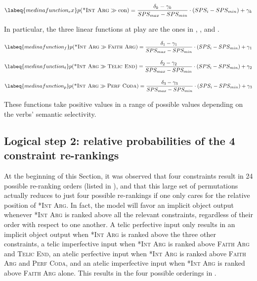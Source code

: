 \begin{equation} \labeq{medinafunction_ex}
p(\textsc{*Int Arg} \gg \textrm{con}) = \frac{\delta_k - \gamma_k}{SPS_{max} - SPS_{min}} \cdot ({SPS_{i} - SPS_{min}}) + \gamma_k
\end{equation}

In particular, the three linear functions at play are the ones in , , and .

\begin{equation} \labeq{medinafunction_f}
p(\textsc{*Int Arg} \gg \textsc{Faith Arg}) = \frac{\delta_1 - \gamma_1}{SPS_{max} - SPS_{min}} \cdot ({SPS_{i} - SPS_{min}}) + \gamma_1
\end{equation}

\begin{equation} \labeq{medinafunction_t}
p(\textsc{*Int Arg} \gg \textsc{Telic End}) = \frac{\delta_2 - \gamma_2}{SPS_{max} - SPS_{min}} \cdot ({SPS_{i} - SPS_{min}}) + \gamma_2
\end{equation}

\begin{equation} \labeq{medinafunction_p}
p(\textsc{*Int Arg} \gg \textsc{Perf Coda}) = \frac{\delta_3 - \gamma_3}{SPS_{max} - SPS_{min}} \cdot ({SPS_{i} - SPS_{min}}) + \gamma_3
\end{equation}

These functions take positive values in a range of possible values depending on the verbs' semantic selectivity. %

\subsection{Logical step 2: relative probabilities of the 4 constraint re-rankings} 
At the beginning of this Section, it was observed that four constraints result in 24 possible re-ranking orders (listed in ), and that this large set of permutations actually reduces to just four possible re-rankings if one only cares for the relative position of \textsc{*Int Arg}. In fact, the model will favor an implicit object output whenever \textsc{*Int Arg} is ranked above all the relevant constraints, regardless of their order with respect to one another. A telic perfective input only results in an implicit object output when \textsc{*Int Arg} is ranked above the three other constraints, a telic imperfective input when \textsc{*Int Arg} is ranked above \textsc{Faith Arg} and \textsc{Telic End}, an atelic perfective input when \textsc{*Int Arg} is ranked above \textsc{Faith Arg} and \textsc{Perf Coda}, and an atelic imperfective input when \textsc{*Int Arg} is ranked above \textsc{Faith Arg} alone. This results in the four possible orderings in .

